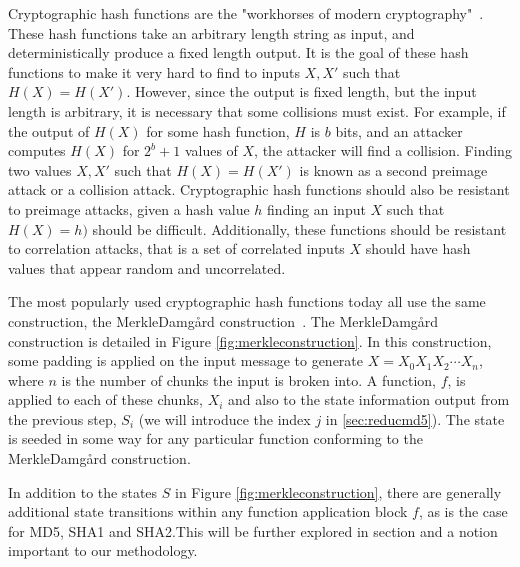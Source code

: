 Cryptographic hash functions are the "workhorses of modern cryptography"~\cite{bruce2004}. These hash functions take an arbitrary length string as input, and deterministically produce a fixed length output. It is the goal of these hash functions to make it very hard to find to inputs $X, X'$ such that $H(X) = H(X')$. However, since the output is fixed length, but the input length is arbitrary, it is necessary that some collisions must exist. For example, if the output of $H(X)$ for some hash function, $H$ is $b$ bits, and an attacker computes $H(X)$ for $2^b + 1$ values of $X$, the attacker will find a collision. Finding two values $X, X'$ such that $H(X) = H(X')$ is known as a second preimage attack or a collision attack. Cryptographic hash functions should also be resistant to preimage attacks, given a hash value $h$ finding an input $X$ such that $H(X) = h)$ should be difficult. Additionally, these functions should be resistant to correlation attacks, that is a set of correlated inputs $X$ should have hash values that appear random and uncorrelated. 

The most popularly used cryptographic hash functions today all use the same construction, the Merkle{\textendash}Damg\r{a}rd construction~\cite{merkle1979secrecy, bruce2004}. The Merkle{\textendash}Damg\r{a}rd construction is detailed in Figure \ref{fig:merkleconstruction}. In this construction, some padding is applied on the input message to generate $X = X_0X_1X_2\cdots X_n$, where $n$ is the number of chunks the input is broken into. A function, $f$, is applied to each of these chunks, $X_i$ and also to the state information output from the previous step, $S_i$ (we will introduce the index $j$ in \ref{sec:reducmd5}). The state is seeded in some way for any particular function conforming to the Merkle{\textendash}Damg\r{a}rd construction. 

In addition to the states $S$ in Figure \ref{fig:merkleconstruction}, there are generally additional state transitions within any function application block $f$, as is the case for MD5, SHA1 and SHA2.This will be further explored in section \label{bbdef} and a notion important to our methodology. 

